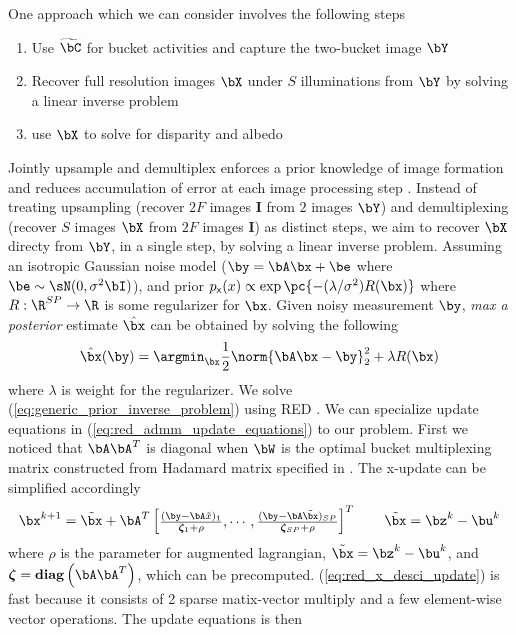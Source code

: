 \documentclass[11pt]{article}
\renewcommand{\sI}{\boldsymbol{I}}
\renewcommand{\diag}{\mathbf{diag}}
\newcommand\rx{\ensuremath{\mathsf{x}}}
\newcommand\bzeta{\ensuremath{\boldsymbol{\zeta}}}
\begin{document}
One approach which we can consider involves the following steps
\begin{enumerate}
    \item Use $\widetilde{\bC}$ for bucket activities and capture the two-bucket image $\bY$
    \item Recover full resolution images $\bX$ under $S$ illuminations from $\bY$ by solving a linear inverse problem
    \item use $\bX$ to solve for disparity and albedo
\end{enumerate}
Jointly upsample and demultiplex enforces a prior knowledge of image formation and reduces accumulation of error at each image processing step \cite{heideFlexISPFlexibleCamera2014}. Instead of treating upsampling (recover $2F$ images $\sI$ from $2$ images $\bY$) and demultiplexing (recover $S$ images $\bX$ from $2F$ images $\sI$) as distinct steps, we aim to recover $\bX$ directy from $\bY$, in a single step, by solving a linear inverse problem. Assuming an isotropic Gaussian noise model ($\by=\bA\bx + \be$ where $\be\sim \sN(0,\sigma^2 \bI)$), and prior $p_{\rx}(x) \propto \exp\pc{- (\lambda/\sigma^2) R(\bx) }$ where $R:\R^{SP}\to\R$ is some regularizer for $\bx$. Given noisy measurement $\by$, \textit{max a posterior} estimate $\hat{\bx}$ can be obtained by solving the following
\begin{align}
    \hat{\bx}(\by)
        = \argmin_{\bx}
        \frac{1}{2} \norm{\bA\bx-\by}_2^2 + \lambda R(\bx)
    \label{eq:generic_prior_inverse_problem}
\end{align}
where $\lambda$ is weight for the regularizer. We solve (\ref{eq:generic_prior_inverse_problem}) using RED \cite{romanoLittleEngineThat2016}. We can specialize update equations in (\ref{eq:red_admm_update_equations}) to our problem. First we noticed that $\bA\bA^T$ is diagonal when $\bW$ is the optimal bucket multiplexing matrix constructed from Hadamard matrix specified in \cite{weiCodedTwoBucketCameras2018}. The x-update can be simplified accordingly \cite{liuRankMinimizationSnapshot2019}
\begin{align}
    \bx^{k+1}
        = \tilde{\bx} + \bA^T \begin{bmatrix}
            \frac{(\by - \bA\tilde{x})_1}{\bzeta_1 + \rho},\cdots, \frac{(\by - \bA\tilde{\bx})_{SP}}{\bzeta_{SP} + \rho}
        \end{bmatrix}^T
        \qquad \tilde{\bx} = \bz^k - \bu^k
    \label{eq:red_x_desci_update}
\end{align}
where $\rho$ is the parameter for augmented lagrangian, $\tilde{\bx} = \bz^k - \bu^k$, and $\bzeta = \diag \left(\bA\bA^T\right)$, which can be precomputed. (\ref{eq:red_x_desci_update}) is fast because it consists of 2 sparse matix-vector multiply and a few element-wise vector operations. The update equations is then
\end{document}
